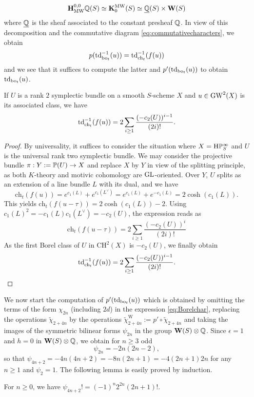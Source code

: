 \[
\mathbf{H}^{0,0}_\mathrm{MW}\mathbb{Q}(S)\simeq \mathbf{K}^{\mathrm{MW}}_0(S)\simeq \underline{\mathbb{Q}}(S)\times \mathbf{W}(S)
\]
where $\underline{\mathbb{Q}}$ is the sheaf associated to the constant presheaf $\mathbb{Q}$. In view of this decomposition and the commutative diagram \eqref{eq:commutativecharacters}, we obtain
\[
p(\operatorname{td}_{\mathrm{bo}_t}^{-1}(u))=\operatorname{td}_{\mathrm{ch}_t}^{-1}(f(u))
\]
and we see that it suffices to compute the latter and $p'(\operatorname{td}_{\mathrm{bo}_t}(u))$ to obtain $\operatorname{td}_{\mathrm{bo}_t}(u)$. 
\begin{prop}\label{prop:Toddforgetful}
If $U$ is a rank $2$ symplectic bundle on a smooth $S$-scheme $X$ and $u\in \operatorname{GW}^2(X)$ is its associated class, we have
\[
\operatorname{td}_{\mathrm{ch}_t}^{-1}(f(u))=2\sum_{i\geq 1} \frac{(-c_2(U))^{i-1}}{(2i)!}.
\]
\end{prop}

\begin{proof}
By universality, it suffices to consider the situation where $X=\mathrm{H}\mathbb P^{\infty}_S$ and $U$ is the universal rank two symplectic bundle. We may consider the projective bundle $\pi:Y:={\mathbb P}(U)\to X$ and replace $X$ by $Y$ in view of the splitting principle, as both $K$-theory and motivic cohomology are $\mathrm{GL}$-oriented. Over $Y$, $U$ splits as an extension of a line bundle $L$ with its dual, and we have 
\[
\mathrm{ch}_t(f(u))=e^{c_1(L)}+e^{c_1(L^\vee)}=e^{c_1(L)}+e^{-c_1(L)}=2\cosh(c_1(L)).
\]
This yields $\mathrm{ch}_t(f(u-\tau))=2\cosh(c_1(L))-2$. Using $c_1(L)^2=-c_1(L)c_1(L^\vee)=-c_2(U)$, the expression reads as
\[
\mathrm{ch}_t(f(u-\tau))=2\sum_{i\geq 1} \frac{(-c_2(U))^i}{(2i)!}
\]
As the first Borel class of $U$ in $\mathrm{CH}^2(X)$ is $-c_2(U)$, we finally obtain
\[
\operatorname{td}_{\mathrm{ch}_t}^{-1}(f(u))=2\sum_{i\geq 1} \frac{(-c_2(U))^{i-1}}{(2i)!}.
\]
\end{proof}

We now start the computation of $p'(\operatorname{td}_{\mathrm{bo}_t}(u))$ which is obtained by omitting the terms of the form $\chi_{2n}$ (including $2d$) in the expression \eqref{eq:Borelchar}, replacing the operations $\tilde \chi_{2+4n}$ by the operations $\tilde \chi_{2+4n}^{\mathrm{W}}:=p'\circ \tilde \chi_{2+4n}$ and taking the images of the symmetric bilinear forms $\psi_{2n}$ in the group $\mathbf{W}(S)\otimes \mathbb{Q}$. Since $\epsilon=1$ and $h=0$ in $\mathbf{W}(S)\otimes \mathbb{Q}$, we obtain for $n\geq 3$ odd
\[
\psi_{2n}=-2n(2n-2),
\]
so that $\psi_{4n+2}=-4n(4n+2)=-8n(2n+1)=-4(2n+1)2n$ for any $n\geq 1$ and $\psi_2=1$.
The following lemma is easily proved by induction.
\begin{lm}
For $n\geq 0$, we have $\psi_{4n+2}!=(-1)^n2^{2n}(2n+1)!$.
\end{lm}

